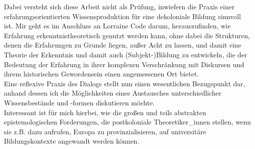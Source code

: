 Dabei versteht sich diese Arbeit nicht als Prüfung, inwiefern die Praxis einer
erfahrungsorientierten Wissensproduktion für eine dekoloniale Bildung sinnvoll
ist. Mir geht es im Anschluss an Lorraine Code darum, herauszufinden, wie
Erfahrung erkenntnistheoretisch genutzt werden kann, ohne dabei die Strukturen,
denen die Erfahrungen zu Grunde liegen, außer Acht zu lassen, und damit eine
Theorie der Erkenntnis und damit auch (Subjekt-)Bildung zu entwickeln, die der
Bedeutung der Erfahrung in ihrer komplexen Verschränkung mit Diskursen und
ihrem historischen Gewordensein einen angemessenen Ort
bietet.\footnotemark{}\\

Eine reflexive Praxis des Dialogs stellt nun einen wesentlichen Bezugspunkt
dar, anhand dessen ich die Möglichkeiten eines Austausches unterschiedlicher
Wissensbestände und -formen diskutieren möchte.\\
Interessant ist für mich
hierbei, wie die großen und teils abstrakten epistemologischen Forderungen, die
postkoloniale Theoretiker\_innen stellen, wenn sie z.B. dazu aufrufen, Europa zu
provinzialisieren,\footnotemark{} auf universitäre Bildungskontexte angewandt werden
können.\\


